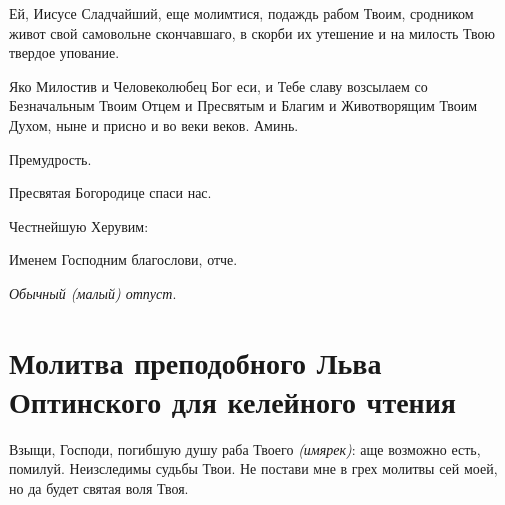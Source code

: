 \begin{mymulticols}
Ей, Иисусе Сладчайший, еще молимтися, подаждь рабом Твоим, сродником живот свой самовольне скончавшаго, в скорби их утешение и на милость Твою твердое упование.

Яко Милостив и Человеколюбец Бог еси, и Тебе славу возсылаем со Безначальным Твоим Отцем и Пресвятым и Благим и Животворящим Твоим Духом, ныне и присно и во веки веков. Аминь.

Премудрость.

Пресвятая Богородице спаси нас.

Честнейшую Херувим:

Именем Господним благослови, отче.

{\itshape Обычный (малый) отпуст}.

\end{mymulticols}

\newpage\section{Молитва преподобного Льва Оптинского для келейного чтения}\begin{mymulticols}

Взыщи, Господи, погибшую душу раба Твоего {\itshape (имярек)}: аще возможно есть, помилуй. Неизследимы судьбы Твои. Не постави мне в грех молитвы сей моей, но да будет святая воля Твоя.

\end{mymulticols}

\mychapterending

